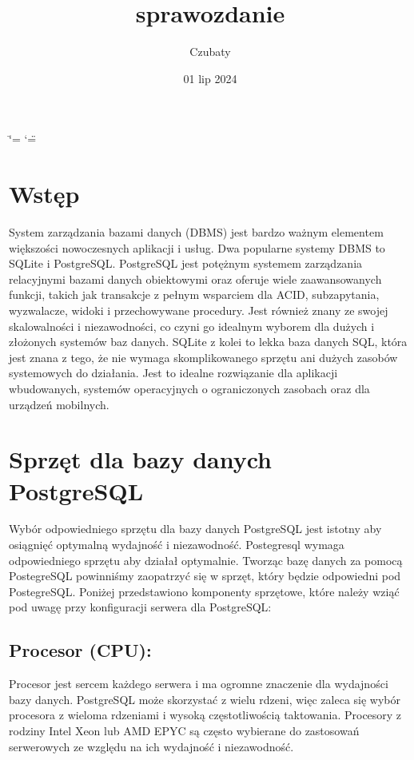 \documentclass[letterpaper,10pt,polish]{sphinxmanual}
\title{sprawozdanie}
\date{01 lip 2024}
\author{Czubaty}
\begin{document}
\ifdefined\shorthandoff
  \ifnum\catcode`\=\string=\active\shorthandoff{=}\fi
  \ifnum\catcode`\"=\active{}\fi
\fi

\pagestyle{empty}
\sphinxmaketitle
\pagestyle{plain}
\sphinxtableofcontents
\pagestyle{normal}
\label{\detokenize{index::doc}}


\sphinxstepscope


\chapter{Wstęp}
\label{\detokenize{DB-Report/Bazy Danych Rozdzia_u0142 1/Wstep:wstep}}\label{\detokenize{DB-Report/Bazy Danych Rozdzia_u0142 1/Wstep::doc}}
\sphinxAtStartPar
System zarządzania bazami danych (DBMS) jest bardzo ważnym elementem większości nowoczesnych aplikacji i usług. Dwa popularne systemy DBMS to SQLite i PostgreSQL. PostgreSQL jest potężnym systemem zarządzania relacyjnymi bazami danych obiektowymi oraz oferuje wiele zaawansowanych funkcji, takich jak transakcje z pełnym wsparciem dla ACID, subzapytania, wyzwalacze, widoki i przechowywane procedury. Jest również znany ze swojej skalowalności i niezawodności, co czyni go idealnym wyborem dla dużych i złożonych systemów baz danych. SQLite z kolei to lekka baza danych SQL, która jest znana z tego, że nie wymaga skomplikowanego sprzętu ani dużych zasobów systemowych do działania. Jest to idealne rozwiązanie dla aplikacji wbudowanych, systemów operacyjnych o ograniczonych zasobach oraz dla urządzeń mobilnych.

\sphinxstepscope


\chapter{Sprzęt dla bazy danych PostgreSQL}
\label{\detokenize{DB-Report/Bazy Danych Rozdzia_u0142 1/Pod_rozdzia_u0142_1:sprzet-dla-bazy-danych-postgresql}}\label{\detokenize{DB-Report/Bazy Danych Rozdzia_u0142 1/Pod_rozdzia_u0142_1::doc}}
\sphinxAtStartPar
Wybór odpowiedniego sprzętu dla bazy danych PostgreSQL jest istotny aby  osiągnięć optymalną wydajność i niezawodność. Postegresql wymaga odpowiedniego sprzętu aby działał optymalnie. Tworząc bazę danych za pomocą PostegreSQL powinniśmy zaopatrzyć się  w sprzęt, który będzie odpowiedni pod PostegreSQL. Poniżej przedstawiono komponenty sprzętowe, które należy wziąć pod uwagę przy konfiguracji serwera dla PostgreSQL:


\section{Procesor (CPU):}
\label{\detokenize{DB-Report/Bazy Danych Rozdzia_u0142 1/Pod_rozdzia_u0142_1:procesor-cpu}}
\sphinxAtStartPar
Procesor jest sercem każdego serwera i ma ogromne znaczenie dla wydajności bazy danych. PostgreSQL może skorzystać z wielu rdzeni, więc zaleca się wybór procesora z wieloma rdzeniami i wysoką częstotliwością taktowania. Procesory z rodziny Intel Xeon lub AMD EPYC są często wybierane do zastosowań serwerowych ze względu na ich wydajność i niezawodność.
\end{document}
